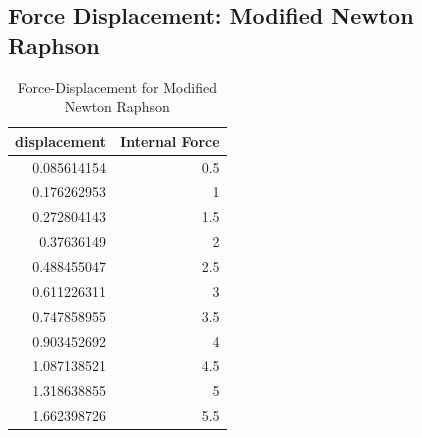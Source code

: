 \documentclass[11pt]{article}
\begin{document}
\subsection*{Force Displacement: Modified Newton Raphson}
\begin{table}[htbp]
  \centering
    \begin{tabular}{|r|r|}
    \toprule
    \multicolumn{1}{|c|}{\textbf{displacement}} & \multicolumn{1}{c|}{\textbf{Internal Force}} \\
    \midrule
    0.085614154 & 0.5 \\
    \midrule
    0.176262953 & 1 \\
    \midrule
    0.272804143 & 1.5 \\
    \midrule
    0.37636149 & 2 \\
    \midrule
    0.488455047 & 2.5 \\
    \midrule
    0.611226311 & 3 \\
    \midrule
    0.747858955 & 3.5 \\
    \midrule
    0.903452692 & 4 \\
    \midrule
    1.087138521 & 4.5 \\
    \midrule
    1.318638855 & 5 \\
    \midrule
    1.662398726 & 5.5 \\
    \bottomrule
    \end{tabular}%
      \caption{Force-Displacement for Modified Newton Raphson}
\end{table}%
\newpage
\end{document}
